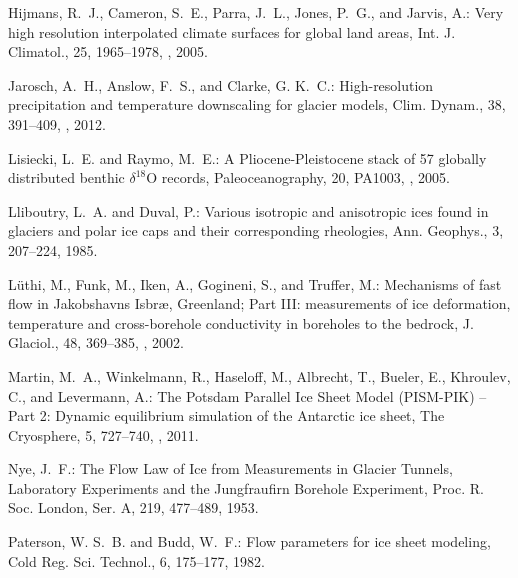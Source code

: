 \begin{thebibliography}{69}
Hijmans, R.~J., Cameron, S.~E., Parra, J.~L., Jones, P.~G., and Jarvis, A.:
  Very high resolution interpolated climate surfaces for global land areas,
  Int. J. Climatol., 25, 1965--1978, , 2005.

Jarosch, A.~H., Anslow, F.~S., and Clarke, G. K.~C.: High-resolution
  precipitation and temperature downscaling for glacier models, Clim. Dynam.,
  38, 391--409, , 2012.

Lisiecki, L.~E. and Raymo, M.~E.: A Pliocene-Pleistocene stack of 57 globally
  distributed benthic $\delta^{18}$O records, Paleoceanography, 20, PA1003,
  , 2005.

Lliboutry, L.~A. and Duval, P.: Various isotropic and anisotropic ices found in
  glaciers and polar ice caps and their corresponding rheologies, Ann.
  Geophys., 3, 207--224, 1985.

L{\"u}thi, M., Funk, M., Iken, A., Gogineni, S., and Truffer, M.: Mechanisms of
  fast flow in {J}akobshavns {I}sbr{\ae}, {G}reenland; {P}art {III}:
  measurements of ice deformation, temperature and cross-borehole conductivity
  in boreholes to the bedrock, J. Glaciol., 48, 369--385,
  , 2002.

Martin, M.~A., Winkelmann, R., Haseloff, M., Albrecht, T., Bueler, E.,
  Khroulev, C., and Levermann, A.: The Potsdam Parallel Ice Sheet Model
  (PISM-PIK) -- Part 2: Dynamic equilibrium simulation of the Antarctic ice
  sheet, The Cryosphere, 5, 727--740, , 2011.

Nye, J.~F.: The Flow Law of Ice from Measurements in Glacier Tunnels,
  Laboratory Experiments and the Jungfraufirn Borehole Experiment, Proc. R.
  Soc. London, Ser. A, 219, 477--489, 1953.

Paterson, W. S.~B. and Budd, W.~F.: Flow parameters for ice sheet modeling,
  Cold Reg. Sci. Technol., 6, 175--177, 1982.


\end{thebibliography}
